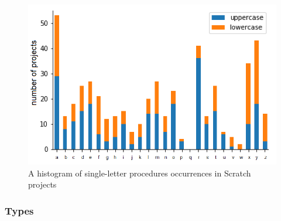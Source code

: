 \documentclass[conference]{IEEEtran}
\begin{document}
\begin{figure}
	\begin{center}
		\includegraphics[width=\columnwidth]{fig/project/single_letter_proc}
		\caption{A histogram of single-letter procedures occurrences in Scratch projects}
		\label{fig:one_letter_occurrence_procedures}
	\end{center}
\end{figure} 

\subsubsection{Types}
\label{res:types}
\end{document}

